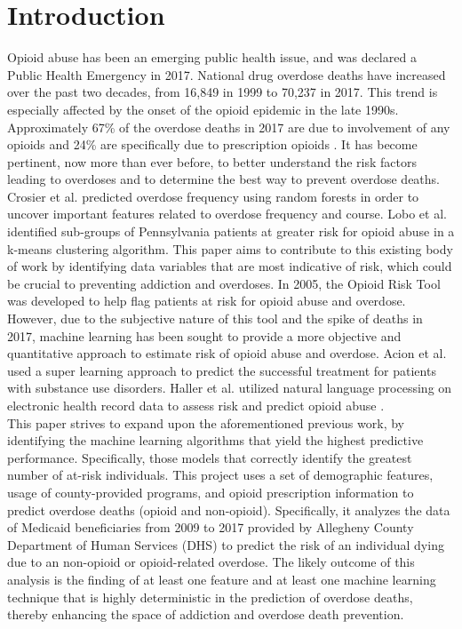 \documentclass[twoside,10.5pt]{article}
\let\footnote=\endnote
\begin{document}
\section{Introduction}
Opioid abuse has been an emerging public health issue, and was declared a Public Health Emergency in 2017\footnote{\cite{HHS}}. National drug overdose deaths have increased over the past two decades, from 16,849 in 1999 to 70,237 in 2017\footnote{\cite{NIDA_ODR}}. This trend is especially affected by the onset of the opioid epidemic in the late 1990s\footnote{\cite{NIDA_OOC}}. Approximately 67\% of the overdose deaths in 2017 are due to involvement of any opioids and 24\% are specifically due to prescription opioids \footnote{\cite{NIDA_ODR}}. It has become pertinent, now more than ever before, to better understand the risk factors leading to overdoses and to determine the best way to prevent overdose deaths. \\

Crosier et al. predicted overdose frequency using random forests in order to uncover important features related to overdose frequency and course\footnote{\cite{Sage}}. Lobo et al. identified sub-groups of Pennsylvania patients at greater risk for opioid abuse in a k-means clustering algorithm\footnote{\cite{Lobo}}. This paper aims to contribute to this existing body of work by identifying data variables that are most indicative of risk, which could be crucial to preventing addiction and overdoses. In 2005, the Opioid Risk Tool was developed to help flag patients at risk for opioid abuse and overdose\footnote{\cite{Webster}}. However, due to the subjective nature of this tool and the spike of deaths in 2017, machine learning has been sought to provide a more objective and quantitative approach to estimate risk of opioid abuse and overdose. Acion et al. used a super learning approach to predict the successful treatment for patients with substance use disorders\footnote{\cite{Acion}}. Haller et al. utilized natural language processing on electronic health record data to assess risk and predict opioid abuse \footnote{\cite{Haller}}. \\

This paper strives to expand upon the aforementioned previous work, by identifying the machine learning algorithms that yield the highest predictive performance. Specifically, those models that correctly identify the greatest number of at-risk individuals. This project uses a set of demographic features, usage of county-provided programs, and opioid prescription information to predict overdose deaths (opioid and non-opioid). Specifically, it analyzes the data of Medicaid beneficiaries from 2009 to 2017 provided by Allegheny County Department of Human Services (DHS) to predict the risk of an individual dying due to an non-opioid or opioid-related overdose. The likely outcome of this analysis is the finding of at least one feature and at least one machine learning technique that is highly deterministic in the prediction of overdose deaths, thereby enhancing the space of addiction and overdose death prevention. 
\end{document}
